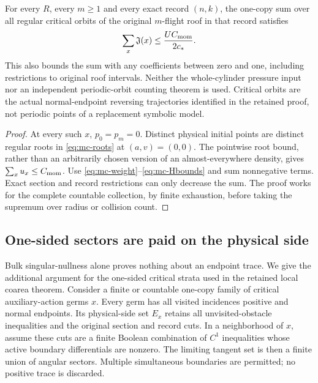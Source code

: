 \begin{theorem}
\label{thm:mc-critical-regular}
For every $R$, every $m\ge1$ and every exact record $(n,k)$, the
one-copy sum over all regular critical orbits of the original $m$-flight
roof in that record satisfies
\begin{equation}\label{eq:mc-critical-regular}
 \sum_x\mathfrak J(x)\le\frac{U C_{\rm mom}}{2c_*}.
\end{equation}
This also bounds the sum with any coefficients between zero and one,
including restrictions to original roof intervals. Neither the
whole-cylinder pressure input nor an independent periodic-orbit
counting theorem is used. Critical orbits are the actual normal-endpoint
reversing trajectories identified in the retained proof, not periodic
points of a replacement symbolic model.
\end{theorem}
\begin{proof}
At every such $x$, $p_0=p_m=0$. Distinct physical initial points are
distinct regular roots in \eqref{eq:mc-roots} at $(a,v)=(0,0)$.
The pointwise root bound, rather than an arbitrarily chosen version
of an almost-everywhere density, gives $\sum_x u_x\le C_{\rm mom}$.
Use \eqref{eq:mc-weight}--\eqref{eq:mc-Hbounds} and sum nonnegative
terms. Exact section and record restrictions can only decrease the
sum. The proof works for the complete countable collection, by finite
exhaustion, before taking the supremum over radius or collision count.
\end{proof}

\subsection{One-sided sectors are paid on the physical side}
Bulk singular-nullness alone proves nothing about an endpoint trace.
We give the additional argument for the one-sided critical strata used
in the retained local coarea theorem. Consider a finite or countable
one-copy family of critical auxiliary-action germs $x$. Every germ has
all visited incidences positive and normal endpoints. Its physical-side
set $E_x$ retains all unvisited-obstacle inequalities and the original
section and record cuts. In a neighborhood of $x$, assume these cuts
are a finite Boolean combination of $C^1$ inequalities whose active
boundary differentials are nonzero. The limiting tangent set is then
a finite union of angular sectors. Multiple simultaneous boundaries
are permitted; no positive trace is discarded.


